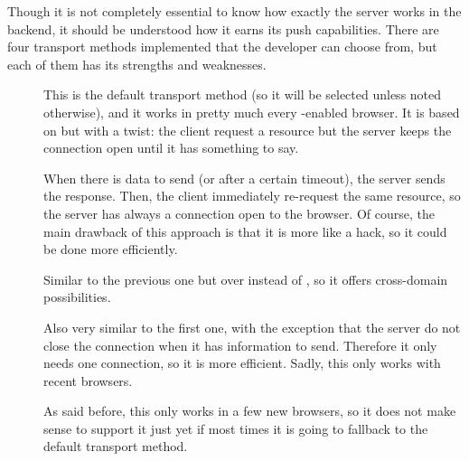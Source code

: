 Though it is not completely essential to know how exactly the  server works in the backend, it should be understood how it earns its push capabilities.
There are four transport methods implemented that the developer can choose from, but each of them has its strengths and weaknesses.

\begin{description}
  \item[] This is the default transport method (so it will be selected unless noted otherwise), and it works in pretty much every -enabled browser.
  It is based on  but with a twist: the client request a resource but the server keeps the  connection open until it has something to say.
  
  When there is data to send (or after a certain timeout), the server sends the response.
  Then, the client immediately re-request the same resource, so the server has always a connection open to the browser.
  Of course, the main drawback of this approach is that it is more like a hack, so it could be done more efficiently.
  \item[] Similar to the previous one but over  instead of , so it offers cross-domain possibilities.
  \item[] Also very similar to the first one, with the exception that the server do not close the connection when it has information to send.
  Therefore it only needs one connection, so it is more efficient.
  Sadly, this only works with recent browsers.
  \item[] As said before, this only works in a few new browsers, so it does not make sense to support it just yet if most times it is going to fallback to the default transport method.
\end{description}
